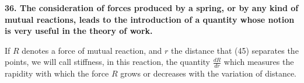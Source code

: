 \documentclass{book}
\begin{document}
\vspace{4mm}
\textbf{36. The consideration of forces produced by a spring, or by any kind of mutual reactions, leads to the introduction of a quantity whose notion is very useful in the theory of work.}
\vspace{4mm} 



If \( R \) denotes a force of mutual reaction, and \( r \) the distance that
\newpage
(45)
separates the points, we will call stiffness, in this reaction, the quantity \( \frac{dR}{dr} \) which measures the rapidity with which the force \( R \) grows or decreases with the variation of distance.






\backmatter
{}
\end{document}

